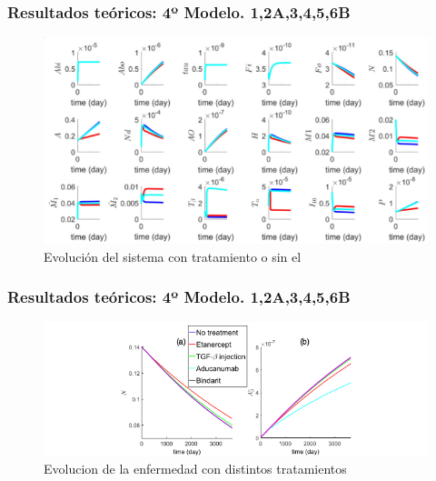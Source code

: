 \documentclass{beamer}
\begin{document}
\begin{frame}
	\frametitle{Resultados teóricos: 4º Modelo. 1,2A,3,4,5,6B}
	\begin{figure}[Atrofia cerebral]
		\includegraphics[scale=0.4]{cuarto.png}
		\caption{Evolución del sistema con tratamiento o sin el}
		\label{cerebro4}
	\end{figure}
	
\end{frame}
\begin{frame}
	\frametitle{Resultados teóricos: 4º Modelo. 1,2A,3,4,5,6B}
	\begin{figure}[Atrofia cerebral]
		\includegraphics[scale=0.4]{quinto.png}
		\caption{Evolucion de la enfermedad con distintos tratamientos}
		\label{cerebro4}
	\end{figure}
	
\end{frame}
\end{document}
